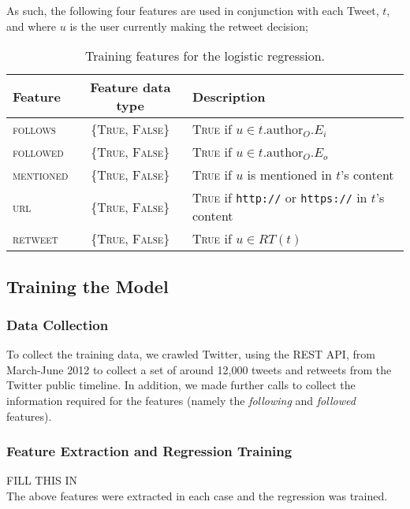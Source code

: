 As such, the following four features are used in conjunction with each Tweet, $t$, and where $u$ is the user currently making the retweet decision;

\begin{table}[h]\footnotesize
\begin{center}
\begin{tabular}{ l | c | l }
	Feature & Feature data type & Description\\
	\hline
	\hline 
	\textsc{follows}    & \{\textsc{True, False}\} & \textsc{True} if $u \in t.\textrm{author}_O.E_i$\\
    \textsc{followed}   & \{\textsc{True, False}\} & \textsc{True} if $u \in t.\textrm{author}_O.E_o$\\
    \textsc{mentioned}  & \{\textsc{True, False}\} & \textsc{True} if $u$ is mentioned in $t$'s content\\
    \textsc{url}        & \{\textsc{True, False}\} & \textsc{True} if \texttt{http://} or \texttt{https://} in $t$'s content\\
    \hline 
    \textsc{retweet}    & \{\textsc{True, False}\} & \textsc{True} if $u \in RT(t)$\\ 
    \hline
\end{tabular}
\end{center}
\caption{Training features for the logistic regression.}
\label{table:logisticregressionfeatures}
\end{table}


\subsection{Training the Model}



\subsubsection{Data Collection}
To collect the training data, we crawled Twitter, using the REST API, from March-June 2012 to collect a set of around 12,000 tweets and retweets from the Twitter public timeline. In addition, we made further calls to collect the information required for the features (namely the \textit{following} and \textit{followed} features). 

\subsubsection{Feature Extraction and Regression Training}
FILL THIS IN
\\
The above features were extracted in each case and the regression was trained.


